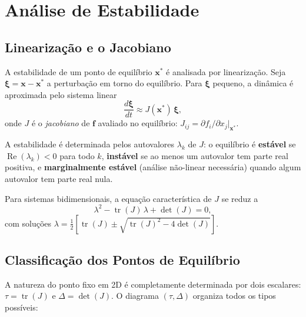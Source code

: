 \section{Análise de Estabilidade}

\subsection{Linearização e o Jacobiano}

A estabilidade de um ponto de equilíbrio $\mathbf{x}^*$ é analisada por linearização. Seja
$\boldsymbol{\xi} = \mathbf{x} - \mathbf{x}^*$ a perturbação em torno do equilíbrio. Para
$\boldsymbol{\xi}$ pequeno, a dinâmica é aproximada pelo sistema linear
\begin{equation}
  \frac{d\boldsymbol{\xi}}{dt} \approx J(\mathbf{x}^*)\,\boldsymbol{\xi},
\end{equation}
onde $J$ é o \emph{jacobiano} de $\mathbf{f}$ avaliado no equilíbrio:
$J_{ij} = \partial f_i / \partial x_j\big|_{\mathbf{x}^*}$.

A estabilidade é determinada pelos autovalores $\lambda_k$ de $J$: o equilíbrio é
\textbf{estável} se $\operatorname{Re}(\lambda_k) < 0$ para todo $k$, \textbf{instável}
se ao menos um autovalor tem parte real positiva, e \textbf{marginalmente estável} (análise
não-linear necessária) quando algum autovalor tem parte real nula.

Para sistemas bidimensionais, a equação característica de $J$ se reduz a
\begin{equation}
  \lambda^2 - \operatorname{tr}(J)\,\lambda + \det(J) = 0,
\end{equation}
com soluções $\lambda = \frac{1}{2}\left[\operatorname{tr}(J) \pm \sqrt{\operatorname{tr}(J)^2 - 4\det(J)}\right]$.

\subsection{Classificação dos Pontos de Equilíbrio}

A natureza do ponto fixo em 2D é completamente determinada por dois escalares:
$\tau = \operatorname{tr}(J)$ e $\Delta = \det(J)$. O diagrama $(\tau, \Delta)$
organiza todos os tipos possíveis:

